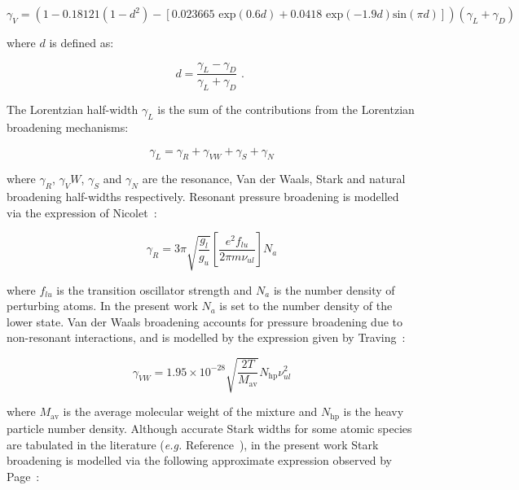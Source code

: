 \begin{equation}
 \gamma_V = \left ( 1 - 0.18121 ( 1 - d^2 ) - \left [ 0.023665 \text{~exp} \left ( 0.6 d \right )  + 0.0418 \text{~exp} \left ( -1.9 d \right ) \text{sin}(\pi d) \right ] \right ) \left ( \gamma_L + \gamma_D \right )
\end{equation}

\noindent where $d$ is defined as:

\begin{equation}
 d = \frac{ \gamma_L - \gamma_D }{ \gamma_L + \gamma_D } \text{ . }
\end{equation}

The Lorentzian half-width $\gamma_L$ is the sum of the contributions from the Lorentzian broadening mechanisms:

\begin{equation}
 \gamma_L = \gamma_R + \gamma_{VW} + \gamma_S + \gamma_N
\end{equation}

\noindent where $ \gamma_R$, $ \gamma_VW$, $\gamma_S$ and $\gamma_N$ are the resonance, Van der Waals, Stark and natural broadening half-widths respectively.
Resonant pressure broadening is modelled via the expression of Nicolet~\cite{Nic70}:

\begin{equation}
 \gamma_R = 3 \pi \sqrt{\frac{g_l}{g_u}} \left [ \frac{e^2 f_{lu}}{2 \pi m \nu_{ul}} \right ] N_a
\end{equation}

\noindent where $f_{lu}$ is the transition oscillator strength and $N_a$ is the number density of perturbing atoms.
In the present work $N_a$ is set to the number density of the lower state.
Van der Waals broadening accounts for pressure broadening due to non-resonant interactions, and is modelled by the expression given by Traving~\cite{Traving95}:

\begin{equation}
 \gamma_{VW} = 1.95 \times 10^{-28} \sqrt{ \frac{2 T}{M_\text{av}} } N_\text{hp} \nu_{ul}^2
\end{equation}

\noindent where $M_\text{av}$ is the average molecular weight of the mixture and $N_\text{hp}$ is the heavy particle number density.
Although accurate Stark widths for some atomic species are tabulated in the literature (\textit{e.g.} Reference~\cite{Griem64}), in the present work Stark broadening is modelled via the following approximate expression observed by Page~\cite{PCB+1968}:

